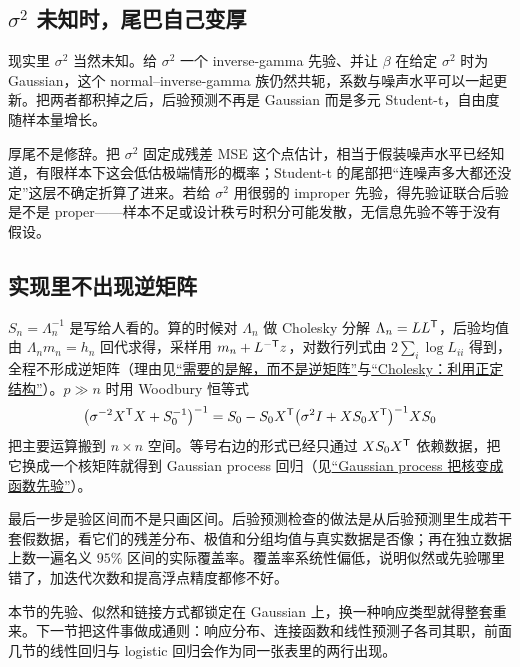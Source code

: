 \subsection{\(\sigma^2\) 未知时，尾巴自己变厚}

现实里 \(\sigma^2\) 当然未知。给 \(\sigma^2\) 一个 inverse-gamma 先验、并让 \(\beta\) 在给定 \(\sigma^2\) 时为 Gaussian，这个 normal--inverse-gamma 族仍然共轭，系数与噪声水平可以一起更新。把两者都积掉之后，后验预测不再是 Gaussian 而是多元 Student-t，自由度随样本量增长。

厚尾不是修辞。把 \(\sigma^2\) 固定成残差 MSE 这个点估计，相当于假装噪声水平已经知道，有限样本下这会低估极端情形的概率；Student-t 的尾部把``连噪声多大都还没定''这层不确定折算了进来。若给 \(\sigma^2\) 用很弱的 improper 先验，得先验证联合后验是不是 proper——样本不足或设计秩亏时积分可能发散，无信息先验不等于没有假设。

\subsection{实现里不出现逆矩阵}

\(S_n=\Lambda_n^{-1}\) 是写给人看的。算的时候对 \(\Lambda_n\) 做 Cholesky 分解 \(\Lambda_n=LL^{\mathsf{T}}\)，后验均值由 \(\Lambda_nm_n=h_n\) 回代求得，采样用 \(m_n+L^{-\mathsf{T}}z\)，对数行列式由 \(2\sum_i\log L_{ii}\) 得到，全程不形成逆矩阵（理由见\hyperref[sec:08-Numerical-Analysis/07-Numerical-Methods-for-ML/03]{``需要的是解，而不是逆矩阵''}与\hyperref[sec:08-Numerical-Analysis/05-Numerical-Linear-Algebra/03]{``Cholesky：利用正定结构''}）。\(p\gg n\) 时用 Woodbury 恒等式
\[
\bigl(\sigma^{-2}X^{\mathsf{T}}X+S_0^{-1}\bigr)^{-1}
=S_0-S_0X^{\mathsf{T}}\bigl(\sigma^2I+XS_0X^{\mathsf{T}}\bigr)^{-1}XS_0
\]
把主要运算搬到 \(n\times n\) 空间。等号右边的形式已经只通过 \(XS_0X^{\mathsf{T}}\) 依赖数据，把它换成一个核矩阵就得到 Gaussian process 回归（见\hyperref[sec:13-Machine-Learning/09-Kernel-Methods-and-Gaussian-Processes/05]{``Gaussian process 把核变成函数先验''}）。

最后一步是验区间而不是只画区间。后验预测检查的做法是从后验预测里生成若干套假数据，看它们的残差分布、极值和分组均值与真实数据是否像；再在独立数据上数一遍名义 \(95\%\) 区间的实际覆盖率。覆盖率系统性偏低，说明似然或先验哪里错了，加迭代次数和提高浮点精度都修不好。

本节的先验、似然和链接方式都锁定在 Gaussian 上，换一种响应类型就得整套重来。下一节把这件事做成通则：响应分布、连接函数和线性预测子各司其职，前面几节的线性回归与 logistic 回归会作为同一张表里的两行出现。
